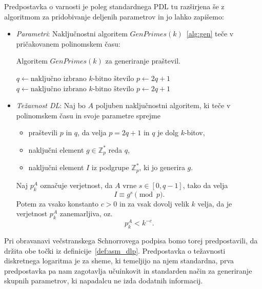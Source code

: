 \documentclass[isrm2, tisk]{fmfdelo}
\newcommand{\Z}{\mathbb Z}
\begin{document}
\begin{definicija}
\label{def:asm_dlp}
    Predpostavka o varnosti je poleg standardnega PDL tu razširjena še z algoritmom za pridobivanje 
    deljenih parametrov in jo lahko zapišemo:
    \begin{itemize}
        \item \textit{Parametri}: Naključnostni algoritem $GenPrimes(k)$~\ref{alg:gen} teče v pričakovanem 
            polinomskem času: 
            \begin{algorithm}
                \caption{Algoritem $GenPrimes(k)$ za generiranje praštevil.}
                \label{alg:gen}
                \begin{algorithmic}
                    \State $q \gets \text{naključno izbrano $k$-bitno število}$
                    \State $p \gets 2q + 1$
                        \State $q \gets \text{naključno izbrano $k$-bitno število}$
                        \State $p \gets 2q + 1$
                    \EndWhile
                    \State {}
                \end{algorithmic}
            \end{algorithm}
        \item \textit{Težavnost DL}: Naj bo $A$ poljuben naključnostni algoritem, ki teče v polinomskem
            času in svoje parametre sprejme 
            \begin{itemize}
                \item praštevili $p$ in $q$, da velja $p = 2q + 1$ in $q$ je dolg $k$-bitov,
                \item naključni element $g \in \Z_p^*$ reda $q$,
                \item naključni element $I$ iz podgrupe $\Z_p^*$, ki jo generira $g$.
            \end{itemize}
            Naj $p_k^A$ označuje verjetnost, da $A$ vrne $s \in [0, q - 1]$, tako da velja
            $$
            I \equiv g^s \pmod p.
            $$
            Potem za vsako konstanto $c > 0$ in za vsak dovolj velik $k$ velja, da je verjetnost $p_k^A$
            zanemarljiva, oz.\
            $$ 
            p_k^A < k^{-c}.
            $$
    \end{itemize}
\end{definicija}

Pri obravanavi večstranskega Schnorrovega podpisa bomo torej predpostavili, da držita obe točki iz
definicije~\ref{def:asm_dlp}. Predpostavka o težavnosti diskretnega logaritma je za sheme, ki temeljijo
na njem standardna, prva predpostavka pa nam zagotavlja učuinkovit in standarden način za generiranje
skupnih parametrov, ki napadalcu ne izda dodatnih informacij.
\end{document}
